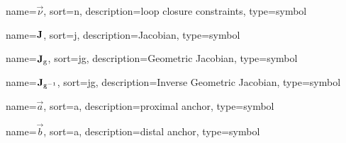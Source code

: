 	{%
		name=\ensuremath{\vec{\nu}},
		sort=n,
		description=loop closure constraints,
		type=symbol
	}
	\newcommand{\loopclosureconstraints}{\gls{sym:loopclosureconstraints}}

	{%
		name=\ensuremath{\mat{J}},
		sort=j,
		description=Jacobian,
		type=symbol
	}
	\newcommand{\jac}{\gls{sym:jac}}

	{%
		name=\ensuremath{\mat{J}_{\func{g}}},
		sort=jg,
		description=Geometric Jacobian,
		type=symbol
	}
	\newcommand{\geometricjac}{\gls{sym:geometricjac}}

	{%
		name=\ensuremath{\mat{J}_{\func{g}^{-1}}},
		sort=jg,
		description=Inverse Geometric Jacobian,
		type=symbol
	}
	\newcommand{\invgeometricjac}{\gls{sym:invgeometricjac}}

	{%
		name=\ensuremath{\vec{a}},
		sort=a,
		description=proximal anchor,
		type=symbol
	}
	\newcommand{\proximalanchor}{\gls{sym:proximalanchor}}

	{%
		name=\ensuremath{\vec{b}},
		sort=a,
		description=distal anchor,
		type=symbol
	}
	\newcommand{\distalanchor}{\gls{sym:distalanchor}}

